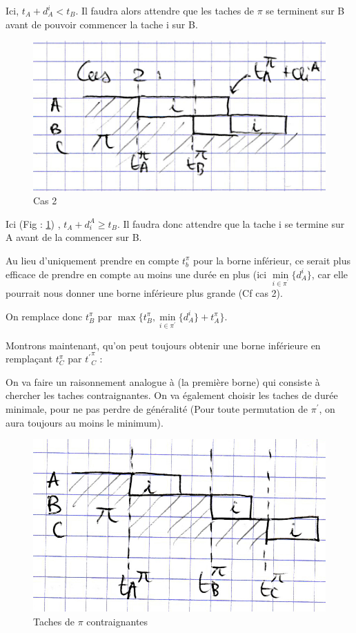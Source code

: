 \documentclass[12pt]{article}
\begin{document}
Ici, $t_A + d_A^i < t_B$. Il faudra alors attendre que les taches de $\pi$ se terminent sur B avant de pouvoir commencer la tache i sur B.

\begin{figure}[!ht]
\centering
\centerline{\includegraphics[scale=1]{6.jpg}}
\caption{Cas 2}
\label{cas12}
\end{figure}

Ici (Fig : \ref{cas12}) ,  $t_A + d_i^A \ge t_B$. Il faudra donc attendre que la tache i se termine sur A avant de la commencer sur B.

Au lieu d'uniquement prendre en compte $t_b^\pi$ pour la borne inférieur, ce serait plus efficace de prendre en compte au moins une durée en plus (ici $\min\limits_{i\in{\pi^\prime}}\{d_A^i\}$, car elle pourrait nous donner une borne inférieure plus grande (Cf cas 2).

On remplace donc $t_B^\pi$ par $\max\{t_B^\pi,\min\limits_{i\in{\pi^\prime}}\{d_A^i\}+t_A^\pi\}$.


Montrons maintenant, qu'on peut toujours obtenir une borne inférieure en remplaçant $t_C^\pi$ par ${t^\prime}_C^\pi$ :

On va faire un raisonnement analogue à (la première borne) qui consiste à chercher les taches contraignantes. On va également choisir les taches de durée minimale, pour ne pas perdre de généralité (Pour toute permutation de $\pi^\prime$, on aura toujours au moins le minimum).

\begin{figure}[!ht]
\centering
\centerline{\includegraphics[scale=1]{7.jpg}}
\caption{Taches de $\pi$ contraignantes}
\label{cas21}
\end{figure}
\end{document}

